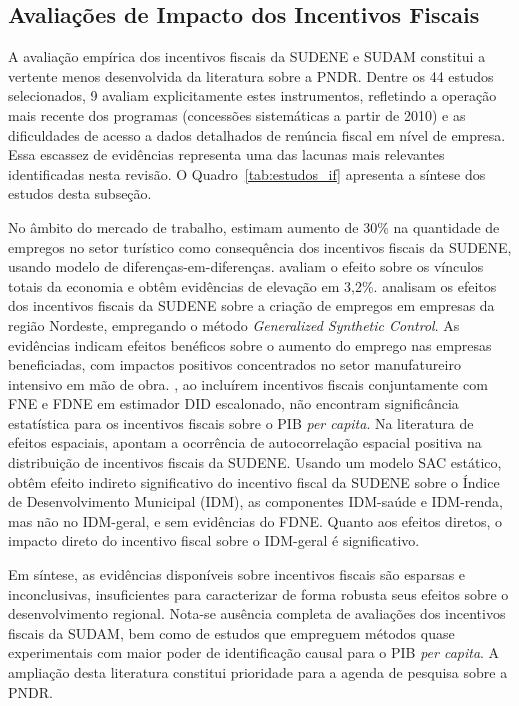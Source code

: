 \subsection{Avaliações de Impacto dos Incentivos Fiscais}

A avaliação empírica dos incentivos fiscais da SUDENE e SUDAM constitui a vertente menos desenvolvida da literatura sobre a PNDR. Dentre os 44 estudos selecionados, 9 avaliam explicitamente estes instrumentos, refletindo a operação mais recente dos programas (concessões sistemáticas a partir de 2010) e as dificuldades de acesso a dados detalhados de renúncia fiscal em nível de empresa. Essa escassez de evidências representa uma das lacunas mais relevantes identificadas nesta revisão. O Quadro~\ref{tab:estudos_if} apresenta a síntese dos estudos desta subseção.



No âmbito do mercado de trabalho,  estimam aumento de 30\% na quantidade de empregos no setor turístico como consequência dos incentivos fiscais da SUDENE, usando modelo de diferenças-em-diferenças.  avaliam o efeito sobre os vínculos totais da economia e obtêm evidências de elevação em 3,2\%.  analisam os efeitos dos incentivos fiscais da SUDENE sobre a criação de empregos em empresas da região Nordeste, empregando o método \textit{Generalized Synthetic Control}. As evidências indicam efeitos benéficos sobre o aumento do emprego nas empresas beneficiadas, com impactos positivos concentrados no setor manufatureiro intensivo em mão de obra. , ao incluírem incentivos fiscais conjuntamente com FNE e FDNE em estimador DID escalonado, não encontram significância estatística para os incentivos fiscais sobre o PIB \textit{per capita}. Na literatura de efeitos espaciais,  apontam a ocorrência de autocorrelação espacial positiva na distribuição de incentivos fiscais da SUDENE. Usando um modelo SAC estático, obtêm efeito indireto significativo do incentivo fiscal da SUDENE sobre o Índice de Desenvolvimento Municipal (IDM), as componentes IDM-saúde e IDM-renda, mas não no IDM-geral, e sem evidências do FDNE. Quanto aos efeitos diretos, o impacto direto do incentivo fiscal sobre o IDM-geral é significativo.

Em síntese, as evidências disponíveis sobre incentivos fiscais são esparsas e inconclusivas, insuficientes para caracterizar de forma robusta seus efeitos sobre o desenvolvimento regional. Nota-se ausência completa de avaliações dos incentivos fiscais da SUDAM, bem como de estudos que empreguem métodos quase experimentais com maior poder de identificação causal para o PIB \textit{per capita}. A ampliação desta literatura constitui prioridade para a agenda de pesquisa sobre a PNDR.

